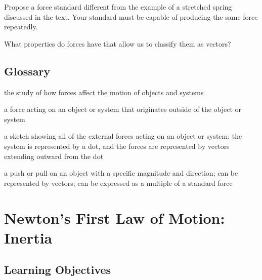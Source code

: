 \documentclass[
]{book}
\providecommand{\tightlist}{%
  \setlength{\itemsep}{0pt}\setlength{\parskip}{0pt}}
\begin{document}
\hypertarget{fs-id1445672}{}
\leavevmode{}%
Propose a force standard different from the example of a stretched
spring discussed in the text. Your standard must be capable of producing
the same force repeatedly.

\hypertarget{fs-id1654920}{}
\leavevmode{}%
What properties do forces have that allow us to classify them as
vectors?

\hypertarget{glossary-11}{%
\subsection{Glossary}\label{glossary-11}}

\begin{description}
\tightlist
\item[dynamics]
the study of how forces affect the motion of objects and systems
\end{description}

\begin{description}
\tightlist
\item[external force]
a force acting on an object or system that originates outside of the
object or system
\end{description}

\begin{description}
\tightlist
\item[free-body diagram]
a sketch showing all of the external forces acting on an object or
system; the system is represented by a dot, and the forces are
represented by vectors extending outward from the dot
\end{description}

\begin{description}
\tightlist
\item[force]
a push or pull on an object with a specific magnitude and direction;
can be represented by vectors; can be expressed as a multiple of a
standard force
\end{description}

\hypertarget{newtons-first-law-of-motion-inertia}{%
\section{Newton's First Law of Motion: Inertia}\label{newtons-first-law-of-motion-inertia}}

\hypertarget{fs-id2242465}{}
\hypertarget{learning-objectives-13}{%
\subsection{Learning Objectives}\label{learning-objectives-13}}
\end{document}
